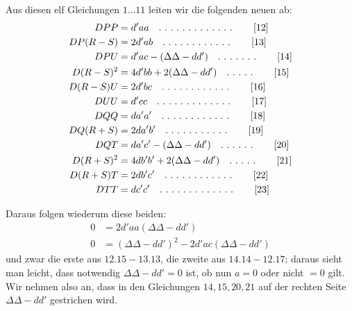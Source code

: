 Aus diesen elf Gleichungen $1\ldots11$ leiten wir die folgenden neuen ab:
\begin{align*}
DPP&=d'aa\quad\ldotp\,\ldotp\,\ldotp\,\ldotp\,\ldotp\,\ldotp\,\ldotp\,\ldotp\,\ldotp\,\ldotp\,\ldotp\,\ldotp\,\ldotp\tag*{[12]}\\
DP(R-S)&=2d'ab\quad\ldotp\,\ldotp\,\ldotp\,\ldotp\,\ldotp\,\ldotp\,\ldotp\,\ldotp\,\ldotp\,\ldotp\,\ldotp\,\ldotp\tag*{[13]}\\
DPU&=d'ac-(\Delta\Delta-dd')\quad\ldotp\,\ldotp\,\ldotp\,\ldotp\,\ldotp\,\ldotp\,\ldotp\tag*{[14]}\\
D(R-S)^2&=4d'bb+2(\Delta\Delta-dd')\quad\ldotp\,\ldotp\,\ldotp\,\ldotp\,\ldotp\tag*{[15]}\\
D(R-S)U&=2d'bc\quad\ldotp\,\ldotp\,\ldotp\,\ldotp\,\ldotp\,\ldotp\,\ldotp\,\ldotp\,\ldotp\,\ldotp\,\ldotp\,\ldotp\tag*{[16]}\\
DUU&=d'cc\quad\ldotp\,\ldotp\,\ldotp\,\ldotp\,\ldotp\,\ldotp\,\ldotp\,\ldotp\,\ldotp\,\ldotp\,\ldotp\,\ldotp\,\ldotp\tag*{[17]}\\
DQQ&=da'a'\quad\ldotp\,\ldotp\,\ldotp\,\ldotp\,\ldotp\,\ldotp\,\ldotp\,\ldotp\,\ldotp\,\ldotp\,\ldotp\,\ldotp\tag*{[18]}\\
DQ(R+S)&=2da'b'\quad\ldotp\,\ldotp\,\ldotp\,\ldotp\,\ldotp\,\ldotp\,\ldotp\,\ldotp\,\ldotp\,\ldotp\,\ldotp\tag*{[19]}\\
DQT&=da'c'-(\Delta\Delta-dd')\quad\ldotp\,\ldotp\,\ldotp\,\ldotp\,\ldotp\,\ldotp\tag*{[20]}\\
D(R+S)^2&=4db'b'+2(\Delta\Delta-dd')\quad\ldotp\,\ldotp\,\ldotp\,\ldotp\,\ldotp\tag*{[21]}\\
D(R+S)T&=2db'c'\quad\ldotp\,\ldotp\,\ldotp\,\ldotp\,\ldotp\,\ldotp\,\ldotp\,\ldotp\,\ldotp\,\ldotp\,\ldotp\,\ldotp\tag*{[22]}\\
DTT&=dc'c'\quad\ldotp\,\ldotp\,\ldotp\,\ldotp\,\ldotp\,\ldotp\,\ldotp\,\ldotp\,\ldotp\,\ldotp\,\ldotp\,\ldotp\,\ldotp\tag*{[23]}
\end{align*}

Daraus folgen wiederum diese beiden:
\[
\begin{aligned}
0&=2d'aa(\Delta\Delta-dd')\\
0&=(\Delta\Delta-dd')^2-2d'ac(\Delta\Delta-dd')
\end{aligned}
\]
und zwar die erste aus $12.15-13.13$, die zweite aus $14.14-12.17$; daraus sieht man leicht, dass notwendig $\Delta\Delta-dd'=0$ ist, ob nun $a=0$ oder nicht $=0$ gilt. Wir nehmen also an, dass in den Gleichungen $14,15,20,21$ auf der rechten Seite $\Delta\Delta-dd'$ gestrichen wird.

